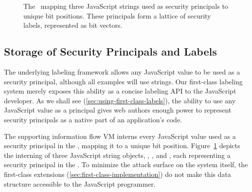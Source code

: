 \begin{figure}[t]
{
}
 \caption{The \FlowLabelRegistry\ mapping three JavaScript strings used as security principals to unique bit positions.
   These principals form a lattice of security labels, represented as bit vectors.}
 \label{fig:flowlabel-lattice}
\end{figure}

\subsection{Storage of Security Principals and Labels}
\label{sec:label-storage}

The underlying labeling framework allows any JavaScript value to be used as a security principal, although all examples will use strings.
Our first-class labeling system merely exposes this ability as a concise labeling API to the JavaScript developer.
As we shall see (\autoref{sec:using-first-class-labels}), the ability to use any JavaScript value as a principal gives web authors enough power to represent security principals as a native part of an application's code.

The supporting information flow VM interns every JavaScript value used as a security principal in the \FlowLabelRegistry, mapping it to a unique bit position.
Figure~\ref{fig:flowlabel-lattice} depicts the interning of three JavaScript string objects, , , and , each representing a security principal in the \FlowLabelRegistry.
To minimize the attack surface on the system itself, the first-class extensions (\autoref{sec:first-class-implementation}) do not make this data structure accessible to the JavaScript programmer.

